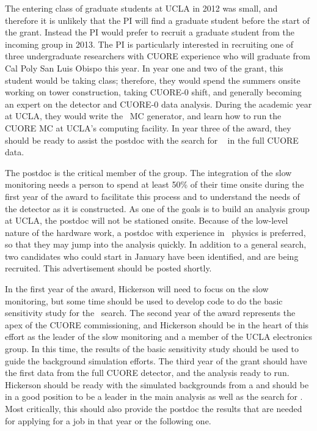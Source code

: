 The entering class of graduate students at UCLA in 2012 was small, and therefore it is unlikely that the PI will find a graduate student before the start of the grant. Instead the PI would prefer to recruit a graduate student from the incoming group in 2013. The PI is particularly interested in recruiting one of three undergraduate researchers with CUORE experience who will graduate from Cal Poly San Luis Obispo this year. In year one and two of the grant, this student would be taking class; therefore, they would spend the summers onsite working on tower construction, taking CUORE-0 shift, and generally becoming an expert on the detector and CUORE-0 data analysis. During the academic year at UCLA, they would write the \maj~MC generator, and learn how to run the CUORE MC at UCLA's computing facility. In year three of the award, they should be ready to assist the postdoc with the search for \maj~ in the full CUORE data.

The postdoc is the critical member of the group. The integration of the slow monitoring needs a person to spend at least 50\% of their time onsite during the first year of the award to facilitate this process and to understand the needs of the detector as it is constructed. As one of the goals is to build an analysis group at UCLA, the postdoc will not be stationed onsite. Because of the low-level nature of the hardware work, a postdoc with experience in \zeronu~physics is preferred, so that they may  jump into the analysis quickly.  In addition to a general search, two candidates who could start in January have been identified, and are being recruited. This advertisement should be posted shortly. 

In the first year of the award, Hickerson will need to focus on the slow monitoring, but some time should be used to develop code to do the basic sensitivity study for the \maj~search. The second year of the award represents the apex of the CUORE commissioning, and Hickerson should be in the heart of this effort as the leader of the slow monitoring and a member of the UCLA electronics group. In this time, the results of the basic sensitivity study should be used to guide the background simulation efforts. The third year of the grant should have the first data from the full CUORE detector, and the analysis ready to run. Hickerson should be ready with the simulated backgrounds from a and should be in a good position to be a leader in the main analysis as well as the search for \maj. Most critically, this should also provide the postdoc the results that are needed for applying for a job in that year or the following one.

